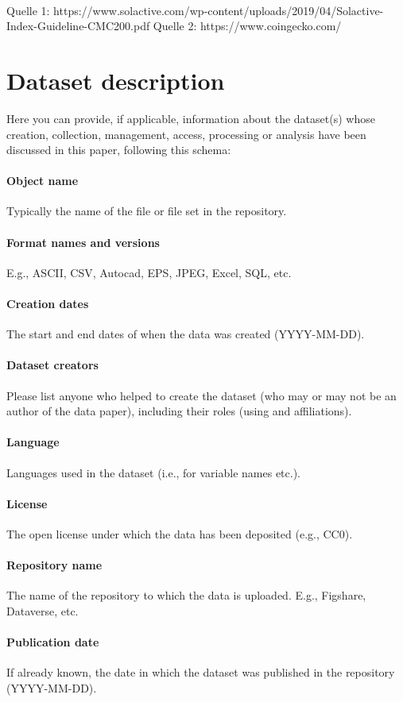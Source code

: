 \documentclass[11pt]{article}
\begin{document}
\\

Quelle 1: https://www.solactive.com/wp-content/uploads/2019/04/Solactive-Index-Guideline-CMC200.pdf
Quelle 2: https://www.coingecko.com/



\section{Dataset description}
Here you can provide, if applicable, information about the dataset(s) whose creation, collection, management, access, processing or analysis have been discussed in this paper, following this schema:
\paragraph{Object name} Typically the name of the file or file set in the repository.
\paragraph{Format names and versions} E.g., ASCII, CSV, Autocad, EPS, JPEG, Excel, SQL, etc.
\paragraph{Creation dates} The start and end dates of when the data was created (YYYY-MM-DD).
\paragraph{Dataset creators} Please list anyone who helped to create the dataset (who may or may not be an author of the data paper), including their roles (using and affiliations).
\paragraph{Language} Languages used in the dataset (i.e., for variable names etc.).
\paragraph{License} The open license under which the data has been deposited (e.g., CC0). 
\paragraph{Repository name} The name of the repository to which the data is uploaded. E.g., Figshare, Dataverse, etc. 
\paragraph{Publication date} If already known, the date in which the dataset was published in the repository (YYYY-MM-DD).
\end{document}
